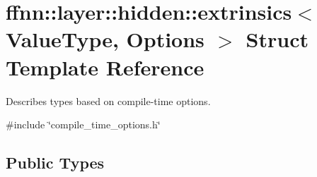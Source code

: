 \hypertarget{structffnn_1_1layer_1_1hidden_1_1extrinsics}{\section{ffnn\-:\-:layer\-:\-:hidden\-:\-:extrinsics$<$ Value\-Type, Options $>$ Struct Template Reference}
\label{structffnn_1_1layer_1_1hidden_1_1extrinsics}
}


Describes types based on compile-\/time options.  




{\ttfamily \#include \char`\"{}compile\-\_\-time\-\_\-options.\-h\char`\"{}}

\subsection*{Public Types}
